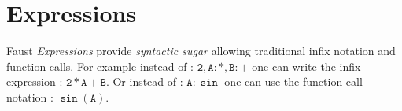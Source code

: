 \documentclass{article}
\begin{document}

\section{Expressions}

Faust \emph{Expressions} provide \emph{syntactic sugar} allowing traditional infix notation and function calls.
For example instead of : $\mathtt{2,A:*,B:+}$ one can write the infix expression : $\mathtt{2*A+B}$.
Or instead of : $\mathtt{A:\sin}$ one can use the function call notation : $\mathtt{\sin(A)}$.

\vspace{5 mm}
\end{document}
